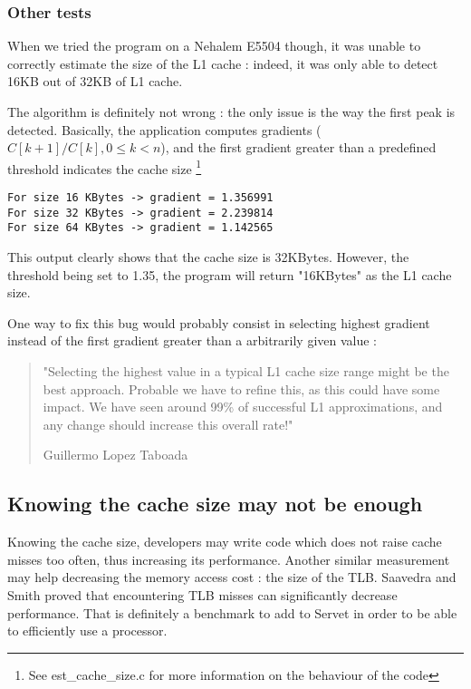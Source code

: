 \subsubsection{Other tests}
When we tried the program on a Nehalem E5504 though, it was unable to correctly
estimate the size of the L1 cache : indeed, it was only able to detect 16KB out
of 32KB of L1 cache.

The algorithm is definitely not wrong : the only issue is the way the first
peak is detected. Basically, the application computes gradients ($ C[k+1]/C[k],
0 \le k < n $), and the first gradient greater than a predefined threshold
indicates the cache size \footnote{See est\_cache\_size.c for more
information on the behaviour of the code}

\lstset{caption=A part of the output of $./job.sh est_cache$ on a Nehalem E5504}
\begin{lstlisting}
For size 16 KBytes -> gradient = 1.356991 
For size 32 KBytes -> gradient = 2.239814 
For size 64 KBytes -> gradient = 1.142565 
\end{lstlisting}

This output clearly shows that the cache size is 32KBytes. However, the
threshold being set to 1.35, the program will return "16KBytes" as the L1 cache
size.

One way to fix this bug would probably consist in selecting highest gradient
instead of the first gradient greater than a arbitrarily given value :

\begin{quotation}
"Selecting the highest value in a typical L1 cache size range might be the best
approach. Probable we have to refine this, as this could have some impact. We
have seen around 99\% of successful L1 approximations, and any change should
increase this overall rate!"
\begin{flushright}Guillermo Lopez Taboada\end{flushright}
\end{quotation}

\subsection{Knowing the cache size may not be enough}
Knowing the cache size, developers may write code which does not raise cache
misses too often, thus increasing its performance. Another similar measurement
may help decreasing the memory access cost : the size of the TLB. Saavedra and
Smith\cite{Cache_TLB} proved that encountering TLB misses can significantly
decrease performance. That is definitely a benchmark to add to Servet in order
to be able to efficiently use a processor.

